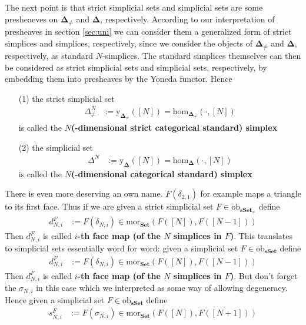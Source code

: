 The next point is that strict simplicial sets and simplicial sets are some presheaeves on $\mathbf{\Delta}_{\neq}$ and $\mathbf{\Delta}$, respectively. According to our interpretation of presheaves in section \ref{sec:uni} we can consider them a generalized form of strict simplices and simplices, respectively, since we consider the objects of $\mathbf{\Delta}_{\neq}$ and $\mathbf{\Delta}$, respectively, as standard $N$-simplices. The standard simplices themselves can then be considered as strict simplicial sets and simplicial sets, respectively, by embedding them into presheaves by the Yoneda functor. Hence
\begin{enumerate}
\item[(1)]
the strict simplicial set
\begin{align*}
  \Delta_{\neq}^{N}
  &:=
  \mathrm{y}_{\mathbf{\Delta}_{\neq}}([N])
  =
  \mathrm{hom}_{\mathbf{\Delta}_{\neq}}(\cdot,[N])
\end{align*}
is called the \textbf{$N$(-dimensional strict categorical standard) simplex}
\item[(2)]
the simplicial set
\begin{align*}
  \Delta^{N}
  &:=
  \mathrm{y}_{\mathbf{\Delta}}([N])
  =
  \mathrm{hom}_{\mathbf{\Delta}}(\cdot,[N])
\end{align*}
is called the \textbf{$N$(-dimensional categorical standard) simplex}
\end{enumerate}
There is even more deserving an own name. $F(\delta_{2,1})$ for example maps a triangle to its first face. Thus if we are given a strict simplicial set $F \in \mathrm{ob}_{\mathbf{sSet}_{\neq}}$ define
\begin{align*}
  d_{N,i}^{F}
  &:=
  F(\delta_{N,i})
  \in
  \mathrm{mor}_{\mathbf{Set}}(F([N]),F([N-1]))
\end{align*}  
Then $d_{N,i}^{F}$ is called \textbf{$i$-th face map (of the $N$ simplices in $F$)}. This translates to simplicial sets essentially word for word: given a simplicial set $F \in \mathrm{ob}_{\mathbf{sSet}}$ define
\begin{align*}
  d_{N,i}^{F}
  &:=
  F(\delta_{N,i})
  \in
  \mathrm{mor}_{\mathbf{Set}}(F([N]),F([N-1]))
\end{align*}  
Then $d_{N,i}^{F}$ is called \textbf{$i$-th face map (of the $N$ simplices in $F$)}. But don't forget the $\sigma_{N,i}$ in this case which we interpreted as some way of allowing degeneracy. Hence given a simplicial set $F \in \mathrm{ob}_{\mathbf{sSet}}$ define
\begin{align*}
  s_{N,i}^{F}
  &:=
  F(\sigma_{N,i})
  \in
  \mathrm{mor}_{\mathbf{Set}}(F([N]),F([N+1]))
\end{align*}

